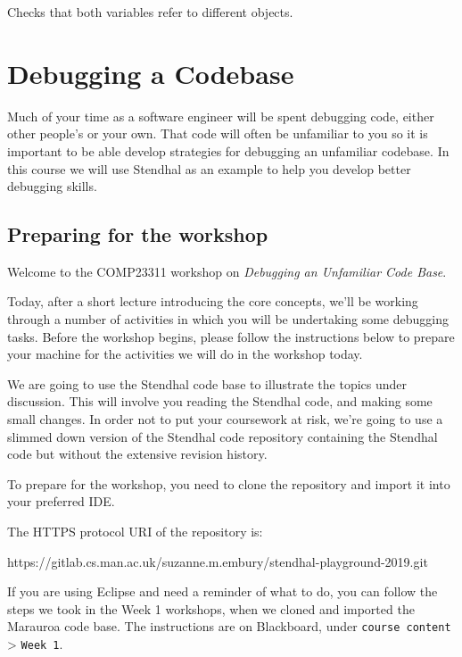 \documentclass[
]{book}
\newenvironment{Shaded}{\begin{snugshade}}{\end{snugshade}}
\newcommand{\NormalTok}[1]{#1}
\begin{document}
Checks that both variables refer to different objects.

\hypertarget{debugging}{%
\chapter{Debugging a Codebase}\label{debugging}}

Much of your time as a software engineer will be spent debugging code, either other people's or your own. That code will often be unfamiliar to you so it is important to be able develop strategies for debugging an unfamiliar codebase. In this course we will use Stendhal as an example to help you develop better debugging skills.

\hypertarget{preparing-for-the-workshop}{%
\section{Preparing for the workshop}\label{preparing-for-the-workshop}}

Welcome to the COMP23311 workshop on \emph{Debugging an Unfamiliar Code Base}.

Today, after a short lecture introducing the core concepts, we'll be working through a number of activities in which you will be undertaking some debugging tasks. Before the workshop begins, please follow the instructions below to prepare your machine for the activities we will do in the workshop today.

We are going to use the Stendhal code base to illustrate the topics under discussion. This will involve you reading the Stendhal code, and making some small changes. In order not to put your coursework at risk, we're going to use a slimmed down version of the Stendhal code repository containing the Stendhal code but without the extensive revision history.

To prepare for the workshop, you need to clone the repository and import it into your preferred IDE.

The HTTPS protocol URI of the repository is:

\begin{Shaded}
\begin{Highlighting}[]
\NormalTok{https://gitlab.cs.man.ac.uk/suzanne.m.embury/stendhal{-}playground{-}2019.git}
\end{Highlighting}
\end{Shaded}

If you are using Eclipse and need a reminder of what to do, you can follow the steps we took in the Week 1 workshops, when we cloned and imported the Marauroa code base. The instructions are on Blackboard, under \texttt{course\ content} \textgreater{} \texttt{Week\ 1}.
\end{document}
